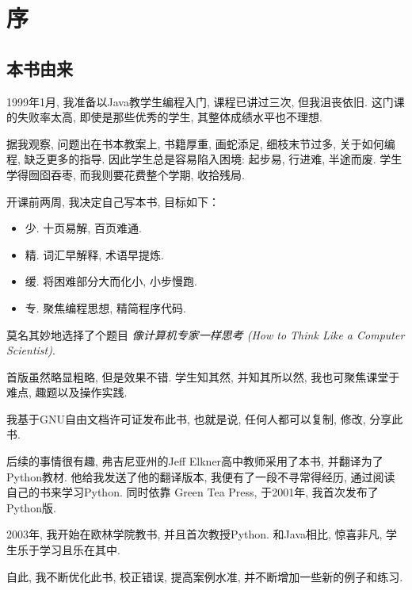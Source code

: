 \documentclass[10pt]{book}
\begin{document}
\fi


\chapter{序}

\section*{本书由来}

1999年1月, 我准备以Java教学生编程入门, 
课程已讲过三次, 但我沮丧依旧. 
这门课的失败率太高, 即使是那些优秀的学生, 其整体成绩水平也不理想.

据我观察, 问题出在书本教案上, 
书籍厚重, 画蛇添足, 细枝末节过多, 关于如何编程, 缺乏更多的指导.
因此学生总是容易陷入困境: 起步易, 行进难, 半途而废.
学生学得囫囵吞枣, 而我则要花费整个学期, 收拾残局.

开课前两周, 我决定自己写本书, 目标如下：

\begin{itemize}

\item 少. 十页易解, 百页难通.

\item 精. 词汇早解释, 术语早提炼.

\item 缓. 将困难部分大而化小, 小步慢跑.

\item 专. 聚焦编程思想, 精简程序代码.

\end{itemize}

莫名其妙地选择了个题目 {\em 像计算机专家一样思考
(How to Think Like a Computer Scientist)}.

首版虽然略显粗略, 但是效果不错. 
学生知其然, 并知其所以然, 我也可聚焦课堂于难点, 趣题以及操作实践. 

我基于GNU自由文档许可证发布此书, 
也就是说, 任何人都可以复制, 修改, 分享此书. 

后续的事情很有趣, 弗吉尼亚州的Jeff Elkner高中教师采用了本书, 
并翻译为了Python教材. 他给我发送了他的翻译版本, 
我便有了一段不寻常得经历, 通过阅读自己的书来学习Python.  
同时依靠 Green Tea Press, 于2001年, 我首次发布了Python版. 

2003年, 我开始在欧林学院教书, 并且首次教授Python. 
和Java相比, 惊喜非凡, 学生乐于学习且乐在其中. 

自此, 我不断优化此书, 校正错误, 提高案例水准, 
并不断增加一些新的例子和练习. 
\end{document}
